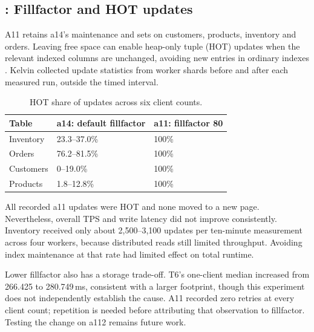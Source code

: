 \subsection{: Fillfactor and HOT updates}
A11 retains a14's maintenance and sets  on customers,
products, inventory and orders. Leaving free space can enable heap-only tuple
(HOT) updates when the relevant indexed columns are unchanged, avoiding new
entries in ordinary indexes \citep{pg-hot}. Kelvin collected update statistics
from worker shards before and after each measured run, outside the timed interval.

\begin{table}[htbp]
\caption{HOT share of updates across six client counts.}
\label{tab:a11}
\begin{tabularx}{\linewidth}{@{}YZZ@{}}
\toprule
\textbf{Table} & \textbf{a14: default fillfactor} & \textbf{a11: fillfactor 80} \\
\midrule
Inventory & 23.3--37.0\% & 100\% \\
Orders & 76.2--81.5\% & 100\% \\
Customers & 0--19.0\% & 100\% \\
Products & 1.8--12.8\% & 100\% \\
\bottomrule
\end{tabularx}
\end{table}

All recorded a11 updates were HOT and none moved to a new page. Nevertheless,
overall TPS and write latency did not improve consistently. Inventory received
only about 2,500--3,100 updates per ten-minute measurement across four workers,
because distributed reads still limited throughput. Avoiding index maintenance
at that rate had limited effect on total runtime.

Lower fillfactor also has a storage trade-off. T6's one-client median increased
from 266.425 to 280.749\,ms, consistent with a larger footprint, though this
experiment does not independently establish the cause. A11 recorded zero retries
at every client count; repetition is needed before attributing that observation
to fillfactor. Testing the change on a112 remains future work.
